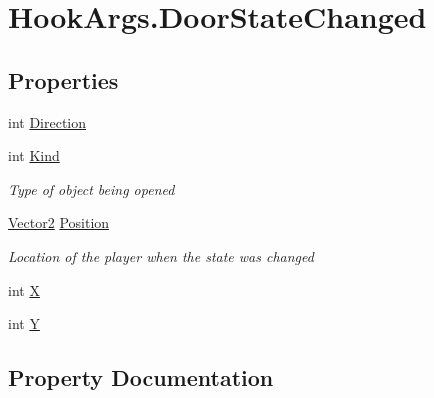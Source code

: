 \hypertarget{structOTA_1_1Plugin_1_1HookArgs_1_1DoorStateChanged}{}\section{Hook\+Args.\+Door\+State\+Changed}
\label{structOTA_1_1Plugin_1_1HookArgs_1_1DoorStateChanged}
\subsection*{Properties}
\begin{DoxyCompactItemize}
\item 
int \hyperlink{structOTA_1_1Plugin_1_1HookArgs_1_1DoorStateChanged_a633488975bec9778113562927745d46c}{Direction}
\item 
int \hyperlink{structOTA_1_1Plugin_1_1HookArgs_1_1DoorStateChanged_a5777a829dc131658862af793314c4570}{Kind}
\begin{DoxyCompactList}\small\item\em Type of object being opened \end{DoxyCompactList}\item 
\hyperlink{structMicrosoft_1_1Xna_1_1Framework_1_1Vector2}{Vector2} \hyperlink{structOTA_1_1Plugin_1_1HookArgs_1_1DoorStateChanged_aab84255a301f0fedbd95b8e45c63ebba}{Position}
\begin{DoxyCompactList}\small\item\em Location of the player when the state was changed \end{DoxyCompactList}\item 
int \hyperlink{structOTA_1_1Plugin_1_1HookArgs_1_1DoorStateChanged_a80c0944640e62d3ed6c5419c1bcc0c88}{X}
\item 
int \hyperlink{structOTA_1_1Plugin_1_1HookArgs_1_1DoorStateChanged_aa482c4cc86a24474e4fb19b5b5978778}{Y}
\end{DoxyCompactItemize}


\subsection{Property Documentation}
\hypertarget{structOTA_1_1Plugin_1_1HookArgs_1_1DoorStateChanged_a633488975bec9778113562927745d46c}{}
